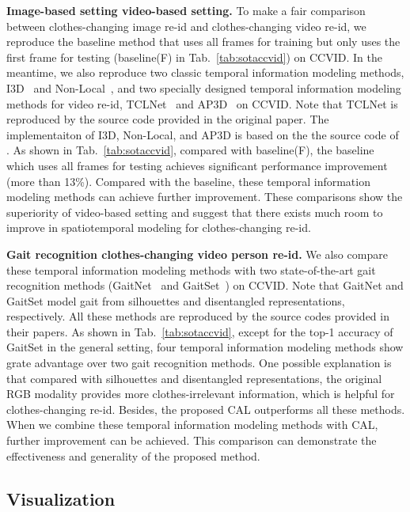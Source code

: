 \documentclass[10pt,twocolumn,letterpaper]{article}
\begin{document}
\noindent
\textbf{Image-based setting \vs video-based setting.} 
To make a fair comparison between clothes-changing image re-id and clothes-changing video re-id, we reproduce the baseline method that uses all frames for training but only uses the first frame for testing (baseline(F) in Tab.~\ref{tab:sotaccvid}) on CCVID.
In the meantime, we also reproduce two classic temporal information modeling methods, \ie I3D~\cite{Carreira2017I3D} and Non-Local~\cite{Wang2018Non}, and two specially designed temporal information modeling methods for video re-id, \ie TCLNet~\cite{Hou2020TCL} and AP3D~\cite{Gu2020AP3D} on CCVID.
Note that TCLNet is reproduced by the source code provided in the original paper.
The implementaiton of I3D, Non-Local, and AP3D is based on the the source code of \cite{Gu2020AP3D}.
As shown in Tab.~\ref{tab:sotaccvid}, compared with baseline(F), the baseline which uses all frames for testing achieves significant performance improvement (more than 13\%).
Compared with the baseline, these temporal information modeling methods can achieve further improvement.
These comparisons show the superiority of video-based setting and suggest that there exists much room to improve in spatiotemporal modeling for clothes-changing re-id.

\medskip
\noindent
\textbf{Gait recognition \vs clothes-changing video person re-id.}
We also compare these temporal information modeling methods with two state-of-the-art gait recognition methods (\ie GaitNet~\cite{Zhang2019Gait} and GaitSet~\cite{Chao2019Gaitset}) on CCVID.
Note that GaitNet and GaitSet model gait from silhouettes and disentangled representations, respectively.
All these methods are reproduced by the source codes provided in their papers. 
As shown in Tab.~\ref{tab:sotaccvid}, except for the top-1 accuracy of GaitSet in the general setting, four temporal information modeling methods show grate advantage over two gait recognition methods.
One possible explanation is that compared with silhouettes and disentangled representations, the original RGB modality provides more clothes-irrelevant information, which is helpful for clothes-changing re-id.
Besides, the proposed CAL outperforms all these methods. 
When we combine these temporal information modeling methods with CAL, further improvement can be achieved.
This comparison can demonstrate the effectiveness and generality of the proposed method.




\subsection{Visualization}
\end{document}

